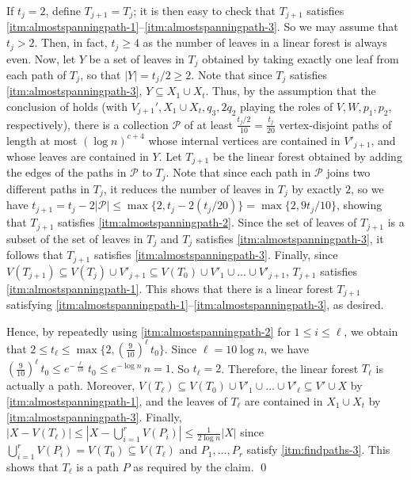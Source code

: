 \documentclass[10pt]{article}
\theoremstyle{plain}
\numberwithin{theorem}{section}
\theoremstyle{definition}
\theoremstyle{remark}
\renewenvironment{proof}[1][]{\begin{trivlist}
\item[\hspace{\labelsep}{\bf\noindent Proof#1.\/}] }{\qed\end{trivlist}}
\theoremstyle{plain}
\begin{document}
\begin{proof}
		If $t_j = 2$, define $T_{j+1} = T_j$; it is then easy to check that $T_{j+1}$ satisfies \ref{itm:almostspanningpath-1}--\ref{itm:almostspanningpath-3}. So we may assume that $t_j > 2$. Then, in fact, $t_j \ge 4$ as the number of leaves in a linear forest is always even. 
		Now, let $Y$ be a set of leaves in $T_j$ obtained by taking exactly one leaf from each path of $T_j$, so that $|Y| = t_j/2 \ge 2$. Note that since $T_j$ satisfies \ref{itm:almostspanningpath-3}, $Y \subseteq X_1 \cup X_t$. 
		Thus, by the assumption that the conclusion of  holds (with $V_{j+1}', X_1 \cup X_t, q_3, 2q_2$ playing the roles of $V, W, p_1, p_2$, respectively), there is a collection $\mathcal P$ of at least $\frac{t_j/2}{10} = \frac{t_j}{20}$ vertex-disjoint paths of length at most $(\log n)^{c+4}$ whose internal vertices are contained in $V'_{j+1}$, and whose leaves are contained in $Y$. Let $T_{j+1}$ be the linear forest obtained by adding the edges of the paths in $\mathcal P$ to $T_j$. Note that since each path in $\mathcal P$ joins two different paths in $T_j$, it reduces the number of leaves in $T_j$ by exactly $2$, so we have $t_{j+1} = t_j - 2|\mathcal P| \le \max\{2, t_j - 2(t_j/20)\} = \max\{2 ,  9t_j/10\}$, showing that $T_{j+1}$ satisfies \ref{itm:almostspanningpath-2}. Since the set of leaves of $T_{j+1}$ is a subset of the set of leaves in $T_j$ and $T_j$ satisfies \ref{itm:almostspanningpath-3}, it follows that $T_{j+1}$ satisfies \ref{itm:almostspanningpath-3}. Finally, since $V(T_{j+1}) \subseteq V(T_j) \cup V'_{j+1} \subseteq V(T_0) \cup V'_1 \cup \ldots \cup V'_{j+1}$, $T_{j+1}$ satisfies \ref{itm:almostspanningpath-1}. This shows that there is a linear forest $T_{j+1}$ satisfying \ref{itm:almostspanningpath-1}--\ref{itm:almostspanningpath-3}, as desired. 

		Hence, by repeatedly using \ref{itm:almostspanningpath-2} for $1 \le i \le \ell$, we obtain that $2 \le t_{\ell} \le \max\{2, (\frac{9}{10})^{\ell} \, t_0\}$. Since $\ell = 10 \log n$, we have $(\frac{9}{10})^{\ell} \, t_0 \le e^{-\frac{\ell}{10}} \, t_0 \le e^{-\log n} \, n = 1$. So $t_{\ell} = 2$. Therefore, the linear forest $T_{\ell}$ is actually a path. Moreover, $V(T_{\ell}) \subseteq V(T_0) \cup V'_1 \cup \ldots \cup V'_{\ell} \subseteq V' \cup X$ by \ref{itm:almostspanningpath-1}, and the leaves of $T_{\ell}$ are contained in $X_1 \cup X_t$ by \ref{itm:almostspanningpath-3}. Finally, $|X - V(T_{\ell})| \le |X - \bigcup_{i = 1 }^r V(P_i)|\le \frac{1}{2 \log n} |X|$ since $\bigcup_{i = 1 }^r V(P_i) = V(T_0) \subseteq V(T_{\ell})$ and $P_1, \ldots, P_r$ satisfy \ref{itm:findpaths-3}. This shows that $T_{\ell}$ is a path $P$ as required by the claim. 
	\end{proof}
\end{document}
